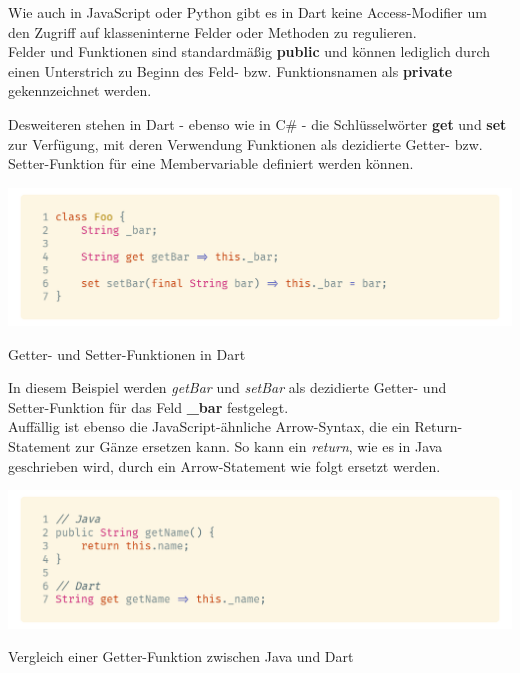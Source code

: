 Wie auch in JavaScript oder Python gibt es in Dart keine Access-Modifier um den Zugriff
auf klasseninterne Felder oder Methoden zu regulieren.\\
Felder und Funktionen sind standardmäßig \textbf{public} und können lediglich durch
einen Unterstrich zu Beginn des Feld- bzw. Funktionsnamen als \textbf{private} gekennzeichnet
werden.

Desweiteren stehen in Dart - ebenso wie in C\# - die Schlüsselwörter \textbf{get} und 
\textbf{set} zur Verfügung, mit deren Verwendung Funktionen als dezidierte Getter- bzw.
Setter-Funktion für eine Membervariable definiert werden können.

\begin{code}
    \centering
    \includegraphics[width=1\textwidth]{images/Dart/dartGetterSetter.png}
    \caption{Getter- und Setter-Funktionen in Dart}
\end{code}

In diesem Beispiel werden \textit{getBar} und \textit{setBar} als dezidierte Getter- und\\
Setter-Funktion für das Feld \textbf{\_bar} festgelegt.\\
Auffällig ist ebenso die JavaScript-ähnliche Arrow-Syntax, die ein Return-Statement
zur Gänze ersetzen kann.
So kann ein \textit{return}, wie es in Java geschrieben wird, durch ein Arrow-Statement wie folgt
ersetzt werden.

\begin{code}
    \centering
    \includegraphics[width=1\textwidth]{images/Dart/dartVSJavaGetter.png}
    \caption{Vergleich einer Getter-Funktion zwischen Java und Dart}
\end{code}

\newpage

